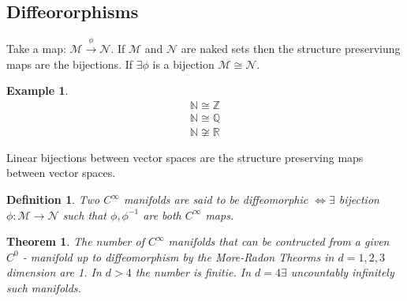 \documentclass[10pt, oneside]{article}
\newcommand{\R}{\mathbb{R}}
\newcommand{\Z}{\mathbb{Z}}
\newcommand{\N}{\mathbb{N}}
\newcommand{\Q}{\mathbb{Q}}
\newcommand{\M}{\mathcal{M}}
\newtheorem{thm}{Theorem}
\newtheorem{defn}{Definition}
\newtheorem{example}{Example}
\begin{document}
   \subsection*{Diffeororphisms}
      Take a map: $\M \xrightarrow{\phi} \mathcal{N}$. If $\M$ and $\mathcal{N}$ are naked sets then the structure preserviung maps are the bijections. If $\exists \phi$ is a bijection $\M \cong \mathcal{N}$.
      \begin{example}
      \begin{align*}
         \N \cong \Z \\
         \N \cong \Q \\
         \N \not \cong \R
      \end{align*}
      \end{example}
      Linear bijections between vector spaces are the structure preserving maps between vector spaces.
      \begin{defn}
         Two $C^\infty$ manifolds are said to be diffeomorphic $\iff \exists$ bijection $\phi: \M \to \mathcal{N}$ such that $\phi, \phi^{-1}$ are both $C^\infty$ maps. 
      \end{defn}
      \begin{thm}
         The number of $C^\infty$ manifolds that can be contructed from a given $C^0$ - manifold up to diffeomorphism by the More-Radon Theorms in $d = 1,2,3$ dimension are 1. In $d > 4$ the number is finitie. In $d=4 \exists$ uncountably infinitely such manifolds. 
      \end{thm}
\end{document}
